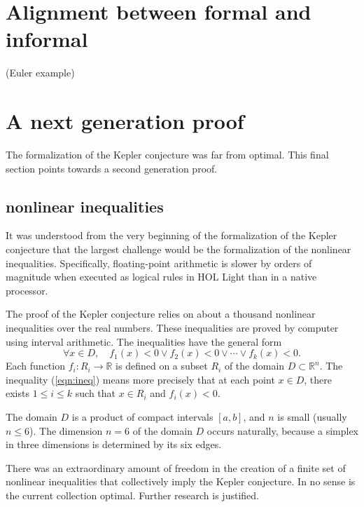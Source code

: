 \documentclass{amsart}
\newcommand{\ring}[1]{\mathbb{#1}}
\begin{document}
\section{Alignment between formal and informal}

(Euler example)

\section{A next generation proof}

The formalization of the Kepler conjecture was far from optimal.  This
final section points towards a second generation proof.

\subsection{nonlinear inequalities}
It was understood from the very beginning of the formalization of the
Kepler conjecture that the largest challenge would be the
formalization of the nonlinear inequalities.  Specifically,
floating-point arithmetic is slower by orders of magnitude when
executed as logical rules in HOL Light than in a native processor.

The proof of the Kepler conjecture relies on about a thousand
nonlinear inequalities over the real numbers.  These inequalities
are proved by computer using interval arithmetic. The inequalities
have the general form 
\begin{equation}\label{eqn:ineq}
\forall x \in D,\quad f_1(x) < 0 \lor f_2(x) < 0 \lor \cdots \lor f_k(x) < 0.
\end{equation}
Each function $f_i : R_i \to \ring{R}$ is defined on a subset $R_i$ of the
domain $D\subset \ring{R}^n$.
The inequality (\ref{eqn:ineq}) means more precisely that 
at each point $x\in D$, there exists $1\le i\le k$ such that
$x \in R_i$ and $f_i(x) < 0$. 

The domain $D$ is a product of 
compact intervals $[a,b]$, and $n$ is small (usually $n\le 6$).  
The dimension $n=6$ of the domain $D$ occurs naturally, because a
simplex in three dimensions is determined by its six edges.

There was an extraordinary amount of freedom in the creation
of a finite set of nonlinear inequalities that collectively imply
the Kepler conjecture.  In no sense is the current collection
optimal.  Further research is justified.
\end{document}
